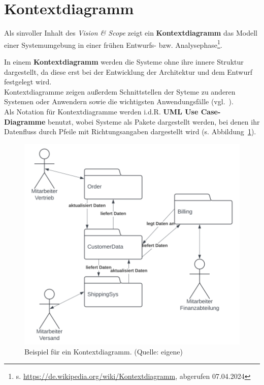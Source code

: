\section{Kontextdiagramm}

\begin{tcolorbox}
    Als sinvoller Inhalt des \textit{Vision \& Scope} zeigt ein \textbf{Kontextdiagramm} das Modell einer Systemumgebung in einer frühen Entwurfs- bzw. Analysephase\footnote{
    s. \url{https://de.wikipedia.org/wiki/Kontextdiagramm}, abgerufen 07.04.2024
    }.
\end{tcolorbox}

\noindent
In einem  \textbf{Kontextdiagramm} werden die Systeme ohne ihre innere Struktur dargestellt, da diese erst bei der Entwicklung der Architektur und dem Entwurf festgelegt wird.\\
Kontextdiagramme zeigen außerdem Schnittstellen der Syteme zu anderen Systemen oder Anwendern sowie die wichtigsten Anwendungsfälle (vgl.~\cite[50]{Wed09}).\\

\noindent
Als Notation für Kontextdiagramme werden i.d.R. \textbf{UML Use Case-Diagramme} benutzt, wobei Systeme als Pakete dargestellt werden, bei denen ihr Datenfluss durch Pfeile mit Richtungsangaben dargestellt wird (s. Abbildung~\ref{fig:contextdiagram}).

\begin{figure}
    \centering
    \includegraphics[scale=0.4]{chapters/Anhang/CheatSheets/img/contextdiagram}
    \caption{Beispiel für ein Kontextdiagramm. (Quelle: eigene)}
    \label{fig:contextdiagram}
\end{figure}
